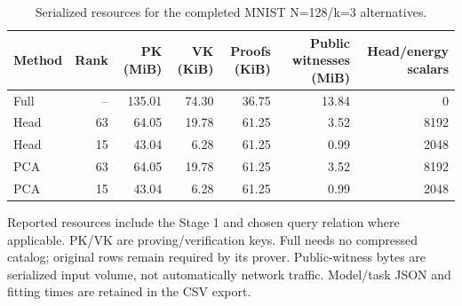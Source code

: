 \begin{table}[tp]
\centering
\small
\caption{Serialized resources for the completed MNIST N=128/k=3 alternatives.}\label{tab:paired-resources}
\begin{tabular}{lrrrrrr}
\toprule
Method & Rank & PK (MiB) & VK (KiB) & Proofs (KiB) & Public witnesses (MiB) & Head/energy scalars \\
\midrule
Full & -- & 135.01 & 74.30 & 36.75 & 13.84 & 0 \\
Head & 63 & 64.05 & 19.78 & 61.25 & 3.52 & 8192 \\
Head & 15 & 43.04 & 6.28 & 61.25 & 0.99 & 2048 \\
PCA & 63 & 64.05 & 19.78 & 61.25 & 3.52 & 8192 \\
PCA & 15 & 43.04 & 6.28 & 61.25 & 0.99 & 2048 \\
\bottomrule
\end{tabular}
\par\smallskip\begin{minipage}{0.98\linewidth}\footnotesize Reported resources include the Stage 1 and chosen query relation where applicable. PK/VK are proving/verification keys. Full needs no compressed catalog; original rows remain required by its prover. Public-witness bytes are serialized input volume, not automatically network traffic. Model/task JSON and fitting times are retained in the CSV export.\end{minipage}
\end{table}
